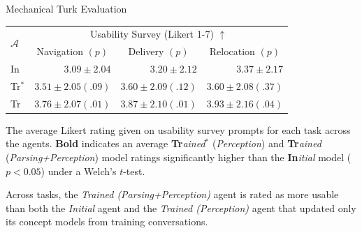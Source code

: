 \documentclass[final]{beamer}
\newcommand{\setblocksize}{\Large \centering}
\newcommand{\paragraphbreak}{\vspace{1cm}}
\begin{document}
\begin{frame}{}
\begin{columns}[t]
\begin{column}{0.24\linewidth}
\begin{block}{\setblocksize Mechanical Turk Evaluation}
{\begin{table}[t]
    \centering
    \begin{tabular}{l r r r}
        \multirow{2}{*}{$\mathcal{A}$} & \multicolumn{3}{c}{Usability Survey (Likert 1-7) $\uparrow$} \\
        & \multicolumn{1}{c}{Navigation $(p)$} & \multicolumn{1}{c}{Delivery $(p)$} & \multicolumn{1}{c}{Relocation $(p)$} \\
        \toprule
        In & $3.09\pm2.04$\phantom{$(.00)$} & $3.20\pm2.12$\phantom{$(.00)$} & $3.37\pm2.17$\phantom{$(.00)$} \\
        Tr$^*$ & $3.51\pm2.05 (.09)$ & $3.60\pm2.09 (.12)$ & $3.60\pm2.08 (.37)$ \\
        Tr & $\pmb{3.76}\pm2.07 (.01)$ & $\pmb{3.87}\pm2.10 (.01)$ & $\pmb{3.93}\pm2.16 (.04)$ \\
        \bottomrule
    \end{tabular}
\end{table}
The average Likert rating given on usability survey prompts for each task across the agents.
{\bf Bold} indicates an average \textbf{Tr}\emph{ained}$^*$ (\emph{Perception}) and \textbf{Tr}\emph{ained} (\emph{Parsing+Perception}) model ratings significantly higher than the \textbf{In}\emph{itial} model ($p<0.05$) under a Welch's $t$-test.
\paragraphbreak

Across tasks, the \emph{Trained (Parsing+Perception)} agent is rated as more usable than both the \emph{Initial} agent and the \emph{Trained (Perception)} agent that updated only its concept models from training conversations.

}
\end{block}
\end{column}
\end{columns}
\end{frame}
\end{document}
